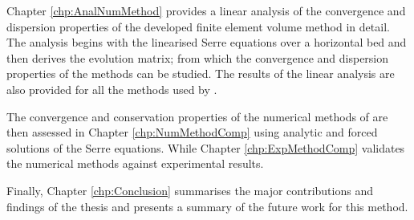 Chapter \ref{chp:AnalNumMethod} provides a linear analysis of the convergence and dispersion properties of the developed finite element volume method in detail. The analysis begins with the linearised Serre equations over a horizontal bed and then derives the evolution matrix; from which the convergence and dispersion properties of the methods can be studied. The results of the linear analysis are also provided for all the methods used by \citet{Pitt-2018-61}.

The convergence and conservation properties of the numerical methods of \citet{Pitt-2018-61} are then assessed in Chapter \ref{chp:NumMethodComp} using analytic and forced solutions of the Serre equations. While Chapter \ref{chp:ExpMethodComp} validates the numerical methods against experimental results.

Finally, Chapter \ref{chp:Conclusion} summarises the major contributions and findings of the thesis and presents a summary of the future work for this method. 


